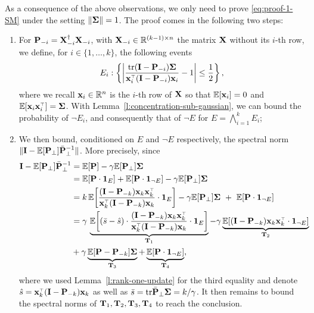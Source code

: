 \documentclass[thesis.tex]{subfiles}
\begin{document}
\bigskip

As a consequence of the above observations, we only need to prove \eqref{eq:proof-1-SM} under the setting $\| \mathbf{\Sigma} \| = 1$. The proof comes in the following two steps:

\begin{enumerate}[leftmargin=*]
  \item For $\mathbf P_{-i} = \mathbf X_{-i}^\dagger \mathbf X_{-i}$, with $\mathbf X_{-i} \in \mathbb R^{(k-1) \times n}$ the matrix $\mathbf X$ without its $i$-th row, we define, for $i \in \{ 1, \ldots, k \}$, the following events
  \begin{equation}\label{eq:def-events-E-F}
    E_i: \left\{ \left| \frac{\tr (\I - \P_{-i}) \Sigmab}{\x_i^\top ( \I - \P_{-i}) \x_i} - 1 \right| \le \frac12 \right\}, 
  \end{equation}
  where we recall $\mathbf x_i \in \mathbb R^n$ is the $i$-th row of $\mathbf X$ so that $\mathbb E[\mathbf x_i] = 0$ and $\E[\x_i \x_i^\top] = \Sigmab$. With Lemma~\ref{l:concentration-sub-gaussian}, we can bound the probability of $\neg E_i$, and consequently that of $\neg E$ for $E = \bigwedge_{i=1}^k E_i$;
  \item We then bound, conditioned on $E$ and $\neg E$ respectively, the spectral norm $\| \mathbf I - \mathbb E[\mathbf P_\perp] \bar {\mathbf P}_\perp^{-1} \|$. More precisely, since
\begin{align*}
  \I-\E[\P_\perp]\bar\P_\perp^{-1}
    &= \E[\P] - \gamma\E[\P_\perp]\Sigmab
    \\
    &= \E[\P \cdot \one_E] +
    \E[\P  \cdot \one_{\neg E}]
    -\gamma\E[\P_\perp]\Sigmab\\
  &=k\,\E\bigg[\frac{(\I - \P_{-k})\x_k\x_k^\top}{\x_k^\top(\I - \P_{-k})\x_k} \cdot \one_E\bigg]
    -\gamma\E[\P_\perp]\Sigmab \ +\     \E[\P \cdot \one_{\neg E}]\\
  &=\gamma\,\underbrace{\E\bigg[(\bar s-\hat
    s)\cdot\frac{(\I -\P_{-k})\x_k\x_k^\top}{\x_k^\top(\I -\P_{-k})\x_k} \cdot \one_E\bigg]}_{\T_1}
    - \gamma \underbrace{\E[ (\I - \P_{-k}) \x_k\x_k^\top \cdot \one_{\neg E}]}_{\T_2} \\ 
    &+ \gamma \underbrace{\E[\P-\P_{-k}]\Sigmab}_{\T_3} + \underbrace{\E[\P \cdot \one_{\neg E}]}_{\T_4},
\end{align*}
where we used Lemma~\ref{l:rank-one-update} for the third equality and denote $\hat s = \x_k^\top ( \I - \P_{-k}) \x_k$ as well as $\bar s = \mathrm{tr} \bar {\mathbf P}_\perp \mathbf{\Sigma} =k/\gamma$. It then remains to bound the spectral norms of $ \mathbf{T}_1, \mathbf{T}_2, \mathbf{T}_3 ,\mathbf{T}_4$ to reach the conclusion.
\end{enumerate}
\end{document}
